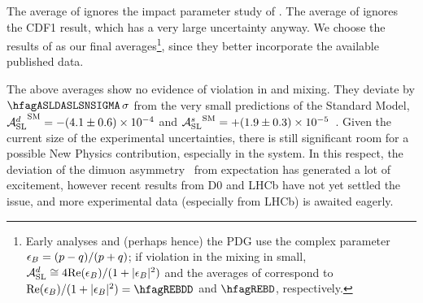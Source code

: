 The average of  %
ignores the impact parameter study of \dzero.
The average of  ignores the CDF1 
result, which has a very large uncertainty anyway.
We choose the results of 
as our final averages\footnote{
  \label{foot:life_mix:epsilon_B}
  Early analyses and (perhaps hence) the PDG use the complex
  parameter $\epsilon_{B} = (p-q)/(p+q)$; if \CP violation in the mixing in small,
  ${\cal A}_{\rm SL}^d \cong 4 {\rm Re}(\epsilon_{B})/(1+|\epsilon_{B}|^2)$ and the averages of
  correspond to ${\rm Re}(\epsilon_{\B})/(1+|\epsilon_{\B}|^2)=\hfagREBDD$ %
  and $\hfagREBD$, respectively.},
since they better incorporate the available published data. 

The above averages show no evidence of \CP violation in \Bd and \Bs mixing.
They deviate by $\hfagASLDASLSNSIGMA\,\sigma$ from the very small predictions of the Standard Model, 
${{\cal A}_{\rm SL}^d}^{\rm SM} = -(4.1\pm 0.6)\times 10^{-4}$ and 
${{\cal A}_{\rm SL}^s}^{\rm SM} = +(1.9\pm 0.3)\times 10^{-5}$~\cite{Lenz:2011ti,*Lenz:2006hd}.
Given the current size of the experimental uncertainties, there is still 
significant room for
a possible New Physics contribution, especially in the \Bs system. 
In this respect, the deviation of the \dzero dimuon
asymmetry~\cite{Abazov:2013uma,*Abazov:2011yk_mod,*Abazov:2010hv_mod_cont,*Abazov:2010hj_mod_cont,*Abazov:2011yk_cont}
from expectation has generated a lot of excitement, however recent results from D0 and LHCb 
have not yet settled the issue, and more experimental data (especially from LHCb) is awaited eagerly. 


